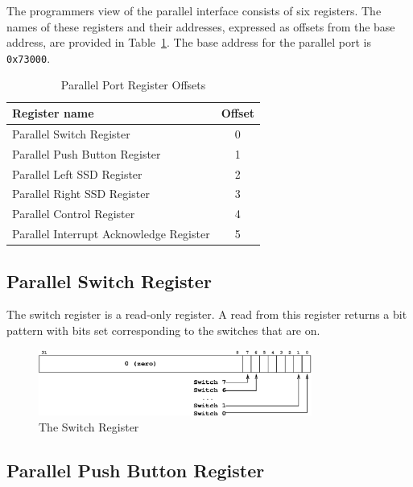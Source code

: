 \documentclass[a4paper,10pt]{article}
\begin{document}
The programmers view of the parallel interface consists of six
registers.  The names of these registers and their addresses,
expressed as offsets from the base address, are provided in
Table~\ref{table:parallel_offsets}. The base address for the parallel
port is \texttt{0x73000}.

\begin{table}[h]
\begin{center}
\begin{tabular}{|l|c|}
\hline
\textbf{Register name} & \textbf{Offset} \\
\hline
Parallel Switch Register & 0 \\
\hline
Parallel Push Button Register & 1 \\
\hline
Parallel Left SSD Register & 2 \\
\hline
Parallel Right SSD Register & 3 \\
\hline
Parallel Control Register & 4 \\
\hline
Parallel Interrupt Acknowledge Register & 5 \\
\hline
\end{tabular}
\caption{Parallel Port Register Offsets}
\label{table:parallel_offsets}
\end{center}
\end{table}



\subsection{Parallel Switch Register}

The switch register is a read-only register. A read from this register
returns a bit pattern with bits set corresponding to the switches that
are on.

\begin{figure}[h]
\begin{center}
\includegraphics[width=0.8\textwidth]{switch_reg.eps}
\caption{The Switch Register}
\label{switch_reg_pic}
\end{center}
\end{figure}


\subsection{Parallel Push Button Register}
\end{document}
